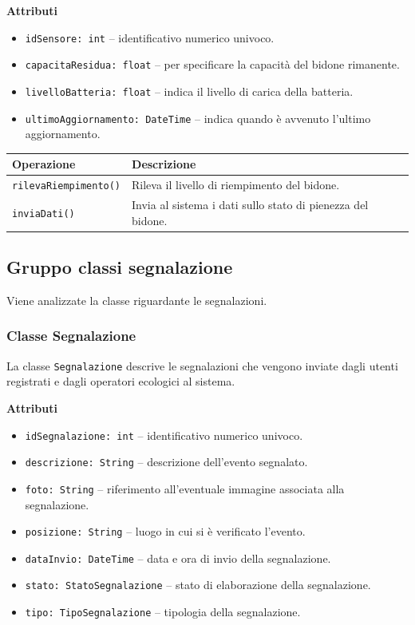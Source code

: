 \documentclass[12pt,a4paper]{article}
\begin{document}
\textbf{Attributi}
\begin{itemize}
    \item \texttt{idSensore: int} -- identificativo numerico univoco.
    \item \texttt{capacitaResidua: float} -- per specificare la capacità del bidone rimanente.
    \item \texttt{livelloBatteria: float} -- indica il livello di carica della batteria.
    \item \texttt{ultimoAggiornamento: DateTime} -- indica quando è avvenuto l'ultimo aggiornamento.
\end{itemize}

\begin{table}[H]
\centering
\begin{tabularx}{\textwidth}{@{}lX@{}}
\toprule
\textbf{Operazione} & \textbf{Descrizione} \\ \midrule
\texttt{rilevaRiempimento()} & Rileva il livello di riempimento del bidone. \\
\texttt{inviaDati()} & Invia al sistema i dati sullo stato di pienezza del bidone. \\
\end{tabularx}
\end{table}

\subsection{Gruppo classi segnalazione} 
Viene analizzate la classe riguardante le segnalazioni.

\subsubsection{Classe Segnalazione}
La classe \texttt{Segnalazione} descrive le segnalazioni che vengono inviate 
dagli utenti registrati e dagli operatori ecologici al sistema.

\textbf{Attributi}
\begin{itemize}
    \item \texttt{idSegnalazione: int} -- identificativo numerico univoco.
    \item \texttt{descrizione: String} -- descrizione dell'evento segnalato.
    \item \texttt{foto: String} -- riferimento all'eventuale immagine associata alla segnalazione.
    \item \texttt{posizione: String} -- luogo in cui si è verificato l'evento.
    \item \texttt{dataInvio: DateTime} -- data e ora di invio della segnalazione.
    \item \texttt{stato: StatoSegnalazione} -- stato di elaborazione della segnalazione.
    \item \texttt{tipo: TipoSegnalazione} -- tipologia della segnalazione.
\end{itemize}
\end{document}
